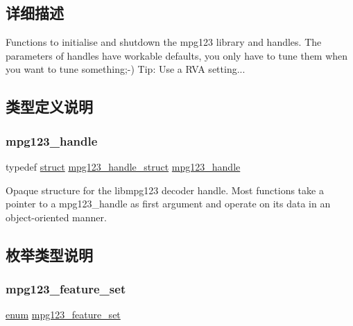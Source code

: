 \subsection{详细描述}
Functions to initialise and shutdown the mpg123 library and handles. The parameters of handles have workable defaults, you only have to tune them when you want to tune something;-\/) Tip\+: Use a R\+VA setting... 

\subsection{类型定义说明}
\mbox{\label{group__mpg123__init_ga6728e2839a395f3a07d4514da659faca}} 
\subsubsection{\texorpdfstring{mpg123\+\_\+handle}{mpg123\_handle}}
{\footnotesize\ttfamily typedef \hyperlink{interfacestruct}{struct} \hyperlink{structmpg123__handle__struct}{mpg123\+\_\+handle\+\_\+struct} \hyperlink{group__mpg123__init_ga6728e2839a395f3a07d4514da659faca}{mpg123\+\_\+handle}}

Opaque structure for the libmpg123 decoder handle. Most functions take a pointer to a mpg123\+\_\+handle as first argument and operate on its data in an object-\/oriented manner. 

\subsection{枚举类型说明}
\mbox{\label{group__mpg123__init_gab26f1b8c3289847f5928176a20b4c942}} 
\subsubsection{\texorpdfstring{mpg123\+\_\+feature\+\_\+set}{mpg123\_feature\_set}}
{\footnotesize\ttfamily \hyperlink{interfaceenum}{enum} \hyperlink{group__mpg123__init_gab26f1b8c3289847f5928176a20b4c942}{mpg123\+\_\+feature\+\_\+set}}

